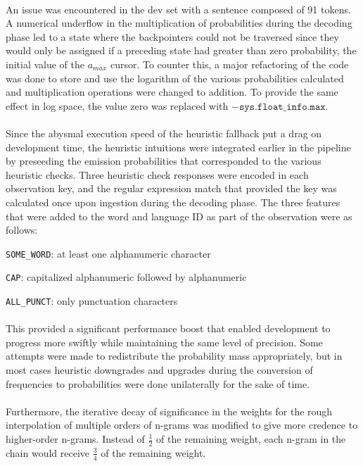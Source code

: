 \documentclass[11pt,a4paper]{article}
\begin{document}
\paragraph{}
An issue was encountered in the dev set with a sentence composed of 91 tokens. A numerical
underflow in the multiplication of probabilities during the decoding phase led to a state
where the backpointers could not be traversed since they would only be assigned if a
preceding state had greater than zero probability, the initial value of the $a_{max}$
cursor. To counter this, a major refactoring of the code was done to store and use
the logarithm of the various probabilities calculated and multiplication operations
were changed to addition. To provide the same effect in log space, the value zero
was replaced with $-\texttt{sys.float\_info.max}$.

\paragraph{}
Since the abysmal execution speed  of the heuristic fallback put a drag on development time,
the heuristic intuitions were integrated earlier in the pipeline by preseeding the
emission probabilities that corresponded to the various heuristic checks. Three
heuristic check responses were encoded in each observation key, and the regular
expression match that provided the key was calculated once upon ingestion during
the decoding phase. The three features that were added to the word and language ID
as part of the observation were as follows:

\itemize
\item{\texttt{SOME\_WORD}: at least one alphanumeric character}
\item{\texttt{CAP}: capitalized alphanumeric followed by alphanumeric}
\item{\texttt{ALL\_PUNCT}: only punctuation characters }

\paragraph{}
This provided a significant performance boost that enabled development to progress
more swiftly while maintaining the same level of precision. Some attempts were made to
redistribute the probability mass appropriately, but in most cases heuristic downgrades
and upgrades during the conversion of frequencies to probabilities were done unilaterally
for the sake of time.

\paragraph{}
Furthermore, the iterative decay of significance in the weights for the rough
interpolation of multiple orders of n-grams was modified to give more credence
to higher-order n-grams. Instead of $\frac{1}{2}$ of the remaining weight, each n-gram
in the chain would receive $\frac{3}{4}$ of the remaining weight.
\end{document}
